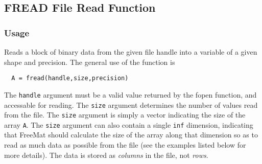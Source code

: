 %
%
%
\subsection{FREAD File Read Function}
\subsubsection{Usage}
Reads a block of binary data from the given file handle into a variable
of a given shape and precision.  The general use of the function is
\begin{verbatim}
  A = fread(handle,size,precision)
\end{verbatim}
The \verb|handle| argument must be a valid value returned by the fopen 
function, and accessable for reading.  The \verb|size| argument determines
the number of values read from the file.  The \verb|size| argument is simply
a vector indicating the size of the array \verb|A|.  The \verb|size| argument
can also contain a single \verb|inf| dimension, indicating that FreeMat should
calculate the size of the array along that dimension so as to read as
much data as possible from the file (see the examples listed below for
more details).  The data is stored as \emph{columns} in the file, not 
\emph{rows}.
    
